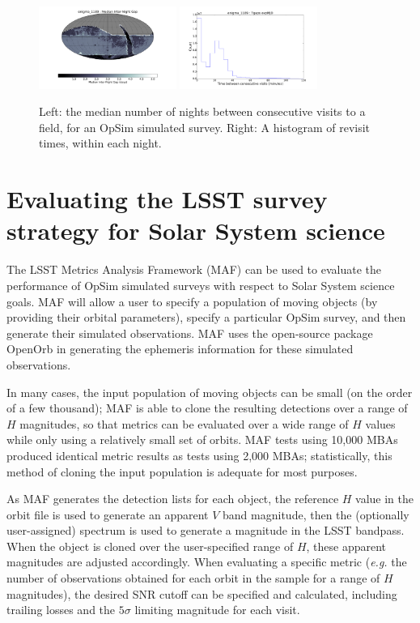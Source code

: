 \documentclass{iau}
\begin{document}
\begin{figure}[tb]
\centering
\includegraphics[width=0.4\textwidth]{internight}
\includegraphics[width=0.4\textwidth]{intranight}
\caption{Left: the median number of nights between consecutive
  visits to a field, for an OpSim simulated survey. Right: A histogram
  of revisit times, within each night.
\label{time}}
\end{figure}


\section{Evaluating the LSST survey strategy for Solar System science}

The LSST Metrics Analysis Framework (MAF) can be used to evaluate the
performance of OpSim simulated surveys with respect to Solar System
science goals. MAF will allow a user to specify a population of moving
objects (by providing their orbital parameters), specify a particular
OpSim survey, and then generate their simulated observations. MAF uses
the open-source package OpenOrb \cite{oorb} in generating the
ephemeris information for these simulated observations.

In many cases, the input population of moving objects can be
small (on the order of a few thousand); MAF is able to clone the resulting
detections over a range of $H$ magnitudes, so that 
metrics can be evaluated over a wide range of $H$ values while only
using a relatively small set of orbits. MAF tests using 10,000 MBAs
produced identical metric results as tests using 2,000 MBAs;
statistically, this method of cloning the input population is 
adequate for most purposes.

As MAF generates the detection lists for each object, the reference
$H$ value in the orbit file is used to generate an apparent $V$ band
magnitude, then the (optionally user-assigned) spectrum is used to
generate a magnitude in the LSST bandpass. When the object is cloned
over the user-specified range of $H$, these apparent magnitudes are
adjusted accordingly. When evaluating a specific metric ({\it e.g.}
the number of observations obtained for each orbit in the sample for a
range of $H$ magnitudes), the desired SNR cutoff can be specified and
calculated, including trailing losses and the $5\sigma$ limiting magnitude for each visit.
\end{document}
